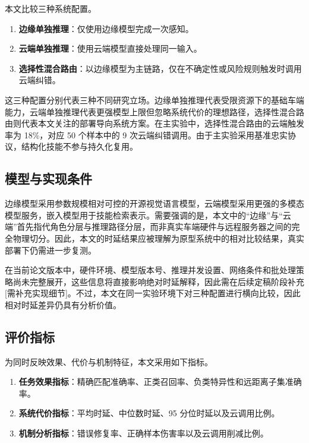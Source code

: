 本文比较三种系统配置。

\begin{enumerate}
  \item \textbf{边缘单独推理}：仅使用边缘模型完成一次感知。
  \item \textbf{云端单独推理}：使用云端模型直接处理同一输入。
  \item \textbf{选择性混合路由}：以边缘模型为主链路，仅在不确定性或风险规则触发时调用云端纠错。
\end{enumerate}

这三种配置分别代表三种不同研究立场。边缘单独推理代表受限资源下的基础车端能力，云端单独推理代表更强模型上限但忽略系统代价的理想路径，选择性混合路由则代表本文关注的部署导向系统方案。在主实验中，选择性混合路由的云端触发率为 18\%，对应 50 个样本中的 9 次云端纠错调用。由于主实验采用基准忠实协议，结构化技能不参与持久化复用。

\subsection{模型与实现条件}

边缘模型采用参数规模相对可控的开源视觉语言模型，云端模型采用更强的多模态模型服务，嵌入模型用于技能检索表示。需要强调的是，本文中的“边缘”与“云端”首先指代角色分层与推理路径分层，而非真实车端硬件与远程服务器之间的完全物理切分。因此，本文的时延结果应被理解为原型系统中的相对比较结果，真实部署下仍需进一步复测。

在当前论文版本中，硬件环境、模型版本号、推理并发设置、网络条件和批处理策略尚未完整展开，这些信息将直接影响绝对时延解释，因此需在后续定稿阶段补充[需补充实现细节]。不过，本文在同一实验环境下对三种配置进行横向比较，因此相对时延差异仍具有分析价值。

\subsection{评价指标}

为同时反映效果、代价与机制特征，本文采用如下指标。

\begin{enumerate}
  \item \textbf{任务效果指标}：精确匹配准确率、正类召回率、负类特异性和远距离子集准确率。
  \item \textbf{系统代价指标}：平均时延、中位数时延、95 分位时延以及云调用比例。
  \item \textbf{机制分析指标}：错误修复率、正确样本伤害率以及云调用削减比例。
\end{enumerate}

